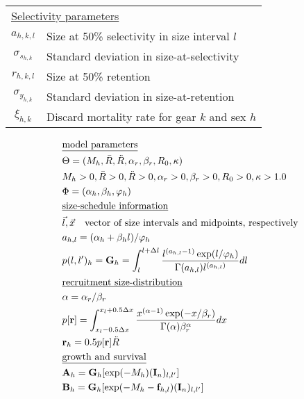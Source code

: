 \documentclass[]{article}
\begin{document}
\begin{table}
\begin{tabular}{cl}
  \multicolumn{2}{l}{\underline{Selectivity parameters}} \\
      $a_{h,k,l}$ & Size at 50\% selectivity in size interval $l$\\
      $\sigma_{s_{h,k}}$ & Standard deviation in size-at-selectivity\\
      $r_{h,k,l}$ & Size at 50\% retention\\
      $\sigma_{y_{h,k}}$ & Standard deviation in size-at-retention\\
      $\xi_{h,k}$ & Discard mortality rate for gear $k$ and sex $h$\\
  \hline
  \end{tabular}
\end{table}

\begin{align}
    & \mbox{\underline{model parameters}} \nonumber \\
    & \Theta = (M_h,\bar{R},\ddot{R},\alpha_r,\beta_r,R_0,\kappa) \label{T1.1} \\
    & M_h > 0 , \bar{R} > 0, \ddot{R}>0, \alpha_r > 0, \beta_r > 0, R_0>0,\kappa > 1.0 \label{T1.2} \\
    & \Phi = (\alpha_h,\beta_h,\varphi_h) \label{T1.3} \\
    & \mbox{\underline{size-schedule information}} \nonumber \\
    & \vec{l},\vec{x} \quad \mbox{vector of size intervals and midpoints, respectively} \nonumber\\
    & a_{h,l} = (\alpha_h + \beta_h l)/\varphi_h \label{T1.4} \\
    & p({l},{l'})_h =\textbf{G}_h= \int_{l}^{l+\Delta l} \frac{ l^{(a_{h,l}-1)} \exp(l/\varphi_h) } { \Gamma(a_{h,l}) l^{(a_{h,l})} } dl \label{T1.5} \\
    & \mbox{\underline{recruitment size-distribution}} \nonumber \\
    & \alpha = \alpha_r / \beta_r  \\
    & p[\textbf{r}] = \int_{x_l-0.5\Delta x}^{x_l+0.5\Delta x} \frac{x^{(\alpha-1)}\exp(- x / \beta_r)}{\Gamma(\alpha)\beta_r^\alpha}dx \label{T1.7}\\
    & \textbf{r}_h = 0.5 p[\textbf{r}] \ddot{R} \label{T1.8}\\
    & \mbox{\underline{growth and survival}} \nonumber \\
    & \textbf{A}_h = \textbf{G}_h [\exp(-M_h) (\textbf{I}_n)_{l,l'}]\label{T1.10}\\
    & \textbf{B}_h = \textbf{G}_h [\exp(-M_h - \textbf{f}_{h,l}) (\textbf{I}_n)_{l,l'}] \label{T1.12}\\

\end{align}
\end{document}

